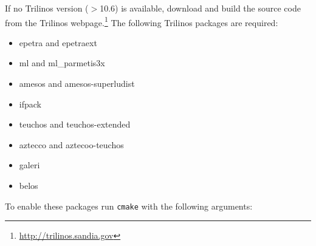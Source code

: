 If no Trilinos version ($>$10.6) is available, download and build the source code from the Trilinos webpage.\footnote{\url{http://trilinos.sandia.gov}} The following Trilinos packages are required:
\begin{itemize}
  \item epetra and epetraext
  \item ml and ml\_parmetis3x
  \item amesos and amesos-superludist
  \item ifpack
  \item teuchos and teuchos-extended
  \item aztecco and aztecoo-teuchos
  \item galeri 
  \item belos
\end{itemize}
To enable these packages run {\tt cmake} with the following arguments:
